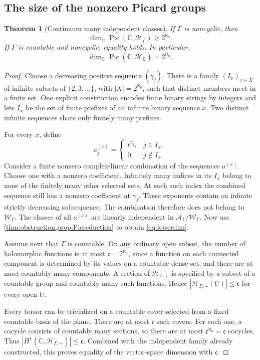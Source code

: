 \documentclass[11pt,letterpaper]{article}
\newtheorem{theorem}{Theorem}[section]
\theoremstyle{definition}
\theoremstyle{remark}
\newcommand{\C}{\mathbb C}
\newcommand{\Q}{\mathbb Q}
\newcommand{\HH}{\mathscr H_\Gamma}
\newcommand{\HP}{\mathscr H_{\Gamma,+}}
\newcommand{\Pic}{\operatorname{Pic}}
\numberwithin{equation}{section}
\begin{document}
\subsection{The size of the nonzero Picard groups}
\begin{theorem}[Continuum many independent classes]\label{thm:dimension}
If $\Gamma$ is noncyclic, then
\begin{equation}\label{eq:lowerdim}
 \dim_\C\Pic(\C,\HH)\ge2^{\aleph_0}.
\end{equation}
If $\Gamma$ is countable and noncyclic, equality holds. In particular,
\begin{equation}\label{eq:Qdim}
 \dim_\C\Pic(\C,\mathscr H_\Q)=2^{\aleph_0}.
\end{equation}
\end{theorem}
\begin{proof}
Choose a decreasing positive sequence $(\gamma_j)$. There is a family $(I_x)_{x\in X}$ of infinite subsets of $\{2,3,\ldots\}$, with $|X|=2^{\aleph_0}$, such that distinct members meet in a finite set. One explicit construction encodes finite binary strings by integers and lets $I_x$ be the set of finite prefixes of an infinite binary sequence $x$. Two distinct infinite sequences share only finitely many prefixes.

For every $x$, define
\[
 a_j^{(x)}=\begin{cases}t^{\gamma_j},&j\in I_x,\\0,&j\notin I_x.\end{cases}
\]
Consider a finite nonzero complex-linear combination of the sequences $a^{(x)}$. Choose one with a nonzero coefficient. Infinitely many indices in its $I_x$ belong to none of the finitely many other selected sets. At each such index the combined sequence still has a nonzero coefficient at $\gamma_j$. These exponents contain an infinite strictly decreasing subsequence. The combination therefore does not belong to $\mathcal W_\Gamma$. The classes of all $a^{(x)}$ are linearly independent in $\mathcal A_\Gamma/\mathcal W_\Gamma$. Now use \cref{thm:obstruction,prop:Picreduction} to obtain \eqref{eq:lowerdim}.

Assume next that $\Gamma$ is countable. On any ordinary open subset, the number of holomorphic functions is at most $\mathfrak c=2^{\aleph_0}$, since a function on each connected component is determined by its values on a countable dense set, and there are at most countably many components. A section of $\HP$ is specified by a subset of a countable group and countably many such functions. Hence $|\HP(U)|\le\mathfrak c$ for every open $U$.

Every torsor can be trivialized on a countable cover selected from a fixed countable basis of the plane. There are at most $\mathfrak c$ such covers. For each one, a cocycle consists of countably many sections, so there are at most $\mathfrak c^{\aleph_0}=\mathfrak c$ cocycles. Thus $|H^1(\C,\HP)|\le\mathfrak c$. Combined with the independent family already constructed, this proves equality of the vector-space dimension with $\mathfrak c$.
\end{proof}
\end{document}
